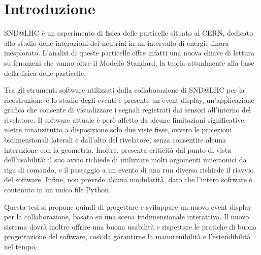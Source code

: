 \chapter*{Introduzione}
SND@LHC è un esperimento di fisica delle particelle situato al CERN, dedicato allo studio delle interazioni dei neutrini in un intervallo di energie finora inesplorato.
L'analisi di queste particelle offre infatti una nuova chiave di lettura su fenomeni che vanno oltre il Modello Standard, la teoria attualmente alla base della fisica delle particelle.

Tra gli strumenti software utilizzati dalla collaborazione di SND@LHC per la ricostruzione e lo studio degli eventi è presente un event display, un'applicazione grafica che consente di visualizzare i segnali registrati dai sensori all'interno del rivelatore.
Il software attuale è però affetto da alcune limitazioni significative: mette innanzitutto a disposizione solo due viste fisse, ovvero le proiezioni bidimensionali laterali e dall'alto del rivelatore, senza consentire alcuna interazione con la geometria.
Inoltre, presenta criticità dal punto di vista dell'usabilità: il suo avvio richiede di utilizzare molti argomenti mnemonici da riga di comando, e il passaggio a un evento di una run diversa richiede il riavvio del software.
Infine, non prevede alcuna modularità, dato che l'intero software è contenuto in un unico file Python.

Questa tesi si propone quindi di progettare e sviluppare un nuovo event display per la collaborazione, basato su una scena tridimensionale interattiva.
Il nuovo sistema dovrà inoltre offrire una buona usabilità e rispettare le pratiche di buona progettazione del software, così da garantirne la manutenibilità e l'estendibilità nel tempo.

